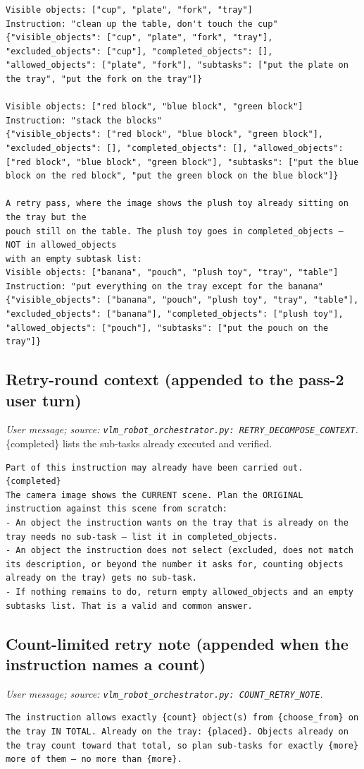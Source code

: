 \begin{lstlisting}[style=prompt]
Visible objects: ["cup", "plate", "fork", "tray"]
Instruction: "clean up the table, don't touch the cup"
{"visible_objects": ["cup", "plate", "fork", "tray"], "excluded_objects": ["cup"], "completed_objects": [], "allowed_objects": ["plate", "fork"], "subtasks": ["put the plate on the tray", "put the fork on the tray"]}

Visible objects: ["red block", "blue block", "green block"]
Instruction: "stack the blocks"
{"visible_objects": ["red block", "blue block", "green block"], "excluded_objects": [], "completed_objects": [], "allowed_objects": ["red block", "blue block", "green block"], "subtasks": ["put the blue block on the red block", "put the green block on the blue block"]}

A retry pass, where the image shows the plush toy already sitting on the tray but the
pouch still on the table. The plush toy goes in completed_objects — NOT in allowed_objects
with an empty subtask list:
Visible objects: ["banana", "pouch", "plush toy", "tray", "table"]
Instruction: "put everything on the tray except for the banana"
{"visible_objects": ["banana", "pouch", "plush toy", "tray", "table"], "excluded_objects": ["banana"], "completed_objects": ["plush toy"], "allowed_objects": ["pouch"], "subtasks": ["put the pouch on the tray"]}
\end{lstlisting}
\subsection*{Retry-round context (appended to the pass-2 user turn)}
\noindent\textit{User message; source: \texttt{vlm\_robot\_orchestrator.py: RETRY\_DECOMPOSE\_CONTEXT}.} \{completed\} lists the sub-tasks already executed and verified.
\begin{lstlisting}[style=prompt]
Part of this instruction may already have been carried out.
{completed}
The camera image shows the CURRENT scene. Plan the ORIGINAL instruction against this scene from scratch:
- An object the instruction wants on the tray that is already on the tray needs no sub-task — list it in completed_objects.
- An object the instruction does not select (excluded, does not match its description, or beyond the number it asks for, counting objects already on the tray) gets no sub-task.
- If nothing remains to do, return empty allowed_objects and an empty subtasks list. That is a valid and common answer.
\end{lstlisting}
\subsection*{Count-limited retry note (appended when the instruction names a count)}
\noindent\textit{User message; source: \texttt{vlm\_robot\_orchestrator.py: COUNT\_RETRY\_NOTE}.}
\begin{lstlisting}[style=prompt]
The instruction allows exactly {count} object(s) from {choose_from} on the tray IN TOTAL. Already on the tray: {placed}. Objects already on the tray count toward that total, so plan sub-tasks for exactly {more} more of them — no more than {more}.
\end{lstlisting}

